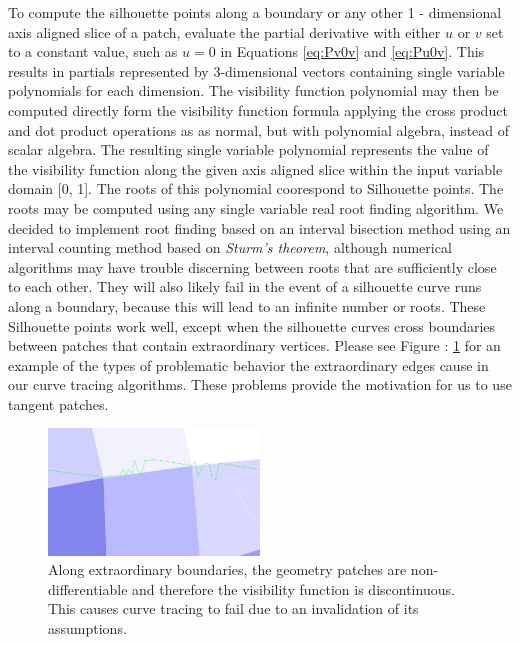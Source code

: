 \documentclass[12pt, letterpaper]{article}
\begin{document}
		To compute the silhouette points along a boundary or any other 1 - dimensional axis aligned slice of a patch, evaluate the partial derivative with either $u$ or $v$ set to a constant value,
		 such as $u = 0$ in Equations \ref{eq:Pv0v} and \ref{eq:Pu0v}. This results in partials represented by 3-dimensional vectors containing single variable polynomials for each dimension.
		The visibility function polynomial may then be computed directly form the visibility function formula applying the cross product and dot product operations as
		as normal, but with polynomial algebra, instead of scalar algebra. The resulting single variable polynomial represents the value of the visibility function 
		along the given axis aligned slice within the input variable domain [0, 1].
		The roots of this polynomial coorespond to Silhouette points. The roots may be computed using any single variable real root finding algorithm.
		We decided to implement root finding based on an interval bisection method using an interval counting method based on \emph{Sturm's theorem}\cite{AV10}, although numerical algorithms may have trouble discerning between roots that are sufficiently close to each other.
		They will also likely fail in the event of a silhouette curve runs along a boundary, because this will lead to an infinite number or roots.
		These Silhouette points work well, except when the silhouette curves cross boundaries between patches that contain extraordinary vertices.
		Please see Figure : \ref{fig:extraordinary_boundaries} for an example of the types of problematic behavior the extraordinary edges cause in our curve tracing algorithms.
		These problems provide the motivation for us to use tangent patches.

		\begin{figure}[h]
		\centering
		\includegraphics[width=0.5\textwidth]{ill_defined_silhouette_curves_over_extraordinary_boundary}
		\caption{Along extraordinary boundaries, the geometry patches are non-differentiable and therefore the visibility function is discontinuous. This causes curve tracing to fail due to an invalidation of its assumptions.}
		\label{fig:extraordinary_boundaries}
		\end{figure}
\end{document}
